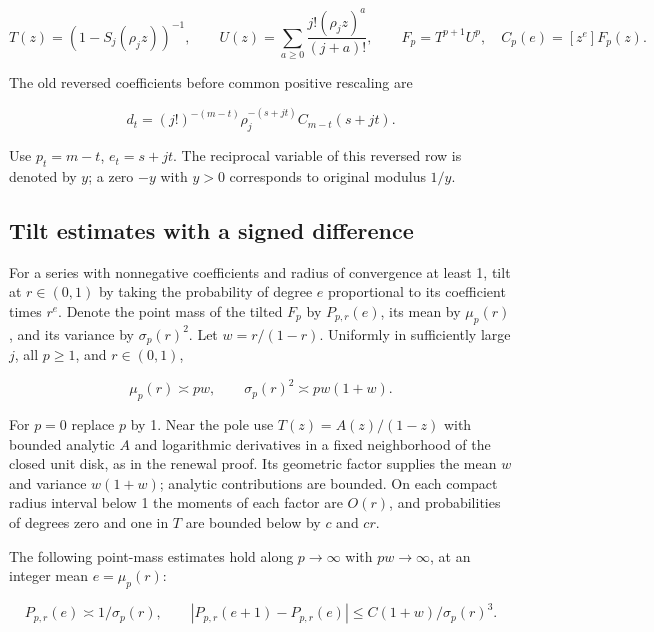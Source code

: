 \documentclass[11pt]{article}
\begin{document}
\begin{equation*}
T(z)=(1-S_j(\rho_j z))^{-1},\qquad
 U(z)=\sum_{a\ge0}\frac{j!(\rho_j z)^a}{(j+a)!},\qquad
 F_p=T^{p+1}U^p,\quad C_p(e)=[z^e]F_p(z).
\end{equation*}

The old reversed coefficients before common positive rescaling are

\begin{equation*}
d_t=(j!)^{-(m-t)}\rho_j^{-(s+jt)} C_{m-t}(s+jt).
\end{equation*}

Use \(p_t=m-t\), \(e_t=s+jt\). The reciprocal variable of this reversed row is denoted by \(y\); a zero \(-y\) with \(y>0\) corresponds to original modulus \(1/y\).

\subsection{Tilt estimates with a signed difference}
\label{sec:tilt-estimates-with-a-signed-difference}

For a series with nonnegative coefficients and radius of convergence at least 1, tilt at \(r\in(0,1)\) by taking the probability of degree \(e\) proportional to its coefficient times \(r^e\). Denote the point mass of the tilted \(F_p\) by \(P_{p,r}(e)\), its mean by \(\mu_p(r)\), and its variance by \(\sigma_p(r)^2\). Let \(w=r/(1-r)\). Uniformly in sufficiently large \(j\), all \(p\ge1\), and \(r\in(0,1)\),

\begin{equation*}
\mu_p(r)\asymp p w,\qquad \sigma_p(r)^2\asymp p w(1+w).
 \tag{2}
\end{equation*}

For \(p=0\) replace \(p\) by 1. Near the pole use \(T(z)=A(z)/(1-z)\) with bounded analytic \(A\) and logarithmic derivatives in a fixed neighborhood of the closed unit disk, as in the renewal proof. Its geometric factor supplies the mean \(w\) and variance \(w(1+w)\); analytic contributions are bounded. On each compact radius interval below 1 the moments of each factor are \(O(r)\), and probabilities of degrees zero and one in \(T\) are bounded below by \(c\) and \(cr\).

The following point-mass estimates hold along \(p\to\infty\) with \(pw\to\infty\), at an integer mean \(e=\mu_p(r)\):

\begin{equation*}
P_{p,r}(e)\asymp 1/\sigma_p(r),\qquad
 |P_{p,r}(e+1)-P_{p,r}(e)|
   \le C(1+w)/\sigma_p(r)^3 .
 \tag{3}
\end{equation*}
\end{document}
